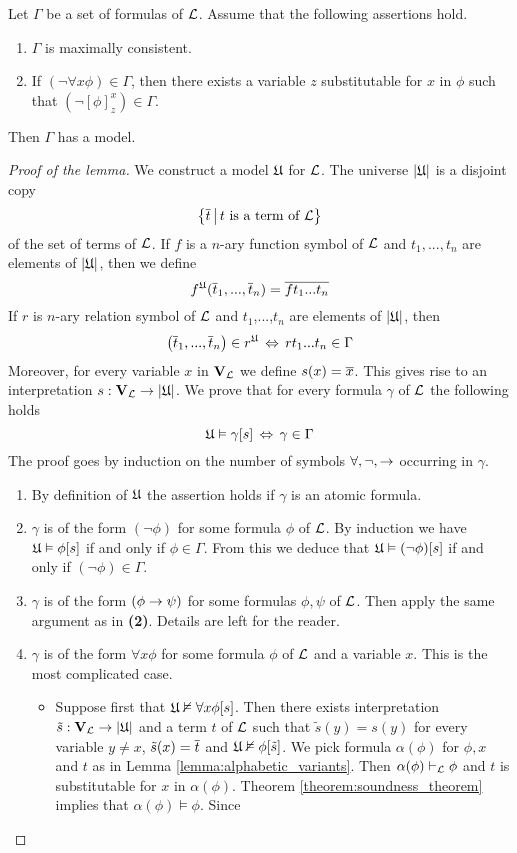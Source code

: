 \begin{lemma}\label{lemma:model_existence_lemma}
Let $\Gamma$ be a set of formulas of ${\mathcal L}$. Assume that the following assertions hold.
\begin{enumerate}[label=\emph{\textbf{(\arabic*)}}, leftmargin=3.0em]
\item $\Gamma$ is maximally consistent.
\item If $(\neg\forall x\phi) \in \Gamma$, then there exists a variable $z$ substitutable for $x$ in $\phi$ such that $(\neg[\phi]^x_z) \in \Gamma$.
\end{enumerate}
Then $\Gamma$ has a model.
\end{lemma}
\begin{proof}[Proof of the lemma]
We construct a model ${\mathfrak U}$ for ${\mathcal L}$. The universe $|{\mathfrak U}|$ is a disjoint copy
$$\big\{\overline{t}\,\big|\,t\mbox{ is a term of }{\mathcal L}\big\}$$
of the set of terms of ${\mathcal L}$. If $f$ is a $n$-ary function symbol of ${\mathcal L}$ and $t_1,...,t_n$ are elements of $|{\mathfrak U}|$, then we define
$$f^{{\mathfrak U}}(\overline{t}_1,...,\overline{t}_n) = \overline{ft_1...t_n}$$
If $r$ is $n$-ary relation symbol of ${\mathcal L}$ and $t_1$,...,$t_n$ are elements of $|{\mathfrak U}|$, then
$$\left(\overline{t}_1,...,\overline{t}_n\right)\in r^{{\mathfrak U}}\,\Leftrightarrow\,rt_1...t_n \in \Gamma$$
Moreover, for every variable $x$ in $\mathbf{V}_{{\mathcal L}}$ we define $s(x) = \overline{x}$. This gives rise to an interpretation $s:\mathbf{V}_{{\mathcal L}}\rightarrow |{\mathfrak U}|$. We prove that for every formula $\gamma$ of ${\mathcal L}$ the following holds
$${\mathfrak U} \vDash \gamma[s] \,\Leftrightarrow\, \gamma \in \Gamma$$
The proof goes by induction on the number of symbols $\forall , \neg, \rightarrow$ occurring in $\gamma$.
\begin{enumerate}[label=\textbf{(\arabic*)}, leftmargin=3.0em]
\item By definition of ${\mathfrak U}$ the assertion holds if $\gamma$ is an atomic formula.
\item $\gamma$ is of the form $(\neg\phi)$ for some formula $\phi$ of ${\mathcal L}$. By induction we have ${\mathfrak U} \vDash \phi[s]$ if and only if $\phi \in \Gamma$. From this we deduce that ${\mathfrak U} \vDash (\neg\phi)[s]$ if and only if $(\neg\phi) \in \Gamma$.
\item $\gamma$ is of the form $(\phi \rightarrow \psi)$ for some formulas $\phi, \psi$ of ${\mathcal L}$. Then apply the same argument as in \textbf{(2)}. Details are left for the reader.
\item $\gamma$ is of the form $\forall x\phi$ for some formula $\phi$ of ${\mathcal L}$ and a variable $x$. This is the most complicated
case.
\begin{itemize}
\item Suppose first that ${\mathfrak U} \nvDash \forall x\phi[s]$. Then there exists interpretation $\tilde{s}:\mathbf{V}_{{\mathcal L}} \rightarrow |{\mathfrak U}|$ and a term $t$ of ${\mathcal L}$ such that $\tilde{s}(y) = s(y)$ for every variable $y \neq x$, $\tilde{s}(x) = \overline{t}$ and ${\mathfrak U} \nvDash \phi[\tilde{s}]$. We pick formula $\alpha(\phi)$ for $\phi, x$ and $t$ as in Lemma \ref{lemma:alphabetic_variants}. Then $\alpha(\phi) \vdash_{{\mathcal L}} \phi$ and $t$ is substitutable for $x$ in $\alpha(\phi)$. Theorem \ref{theorem:soundness_theorem} implies that $\alpha(\phi) \vDash \phi$. Since

\end{itemize}
\end{enumerate}
\end{proof}
